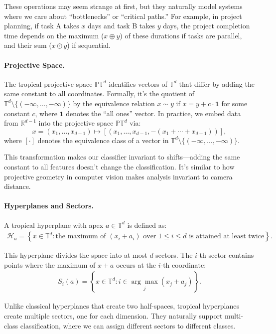 \documentclass{article}
\renewcommand{\leq}{\leqslant}
\newcommand{\R}{\mathbb{R}}
\newcommand{\trop}{\mathbb{T}}
\newcommand{\proj}{\mathbb{P}}
\begin{document}
These operations may seem strange at first, but they naturally model systems where we care about ``bottlenecks'' or ``critical paths.'' For example, in project planning, if task A takes $x$ days and task B takes $y$ days, the project completion time depends on the maximum ($x \oplus y$) of these durations if tasks are parallel, and their sum ($x \odot y$) if sequential.

\paragraph{Projective Space.}  
The tropical projective space $\proj \trop^d$ identifies vectors of $\trop^d$ that differ by adding the same constant to all coordinates. Formally, it's the quotient of $\trop^d \setminus \{(-\infty,\dots,-\infty)\}$ by the equivalence relation $x \sim y$ if $x = y + c \cdot \mathbf{1}$ for some constant $c$, where $\mathbf{1}$ denotes the ``all ones'' vector. In practice, we embed data from $\R^{d-1}$ into the projective space $\proj \trop^d$ via:
\[
x=(x_1,\dots,x_{d-1})\mapsto [(x_1,\dots,x_{d-1},-(x_1+\cdots+x_{d-1}))],
\]
where $[\cdot]$ denotes the equivalence class of a vector in  $\trop^d \setminus \{(-\infty,\dots,-\infty)\}$.

This transformation makes our classifier invariant to shifts—adding the same constant to all features doesn't change the classification. It's similar to how projective geometry in computer vision makes analysis invariant to camera distance.

\paragraph{Hyperplanes and Sectors.}
A tropical hyperplane with apex $a \in \trop^d$ is defined as:
\begin{align}
\mathcal{H}_a = \left\{ x \in \trop^d : \text{the maximum of }(x_i + a_i)\text{ over $1\leq i\leq d$ is attained at least twice} \right\}.
\end{align}

This hyperplane divides the space into at most $d$ sectors. The $i$-th sector contains points where the maximum of $x + a$ occurs at the $i$-th coordinate:
\begin{align}
S_i(a) = \left\{x \in \trop^d : i \in \underset{j}{\arg\max} (x_j + a_j)\right\}.
\end{align}

Unlike classical hyperplanes that create two half-spaces, tropical hyperplanes create multiple sectors, one for each dimension. They naturally support multi-class classification, where we can assign different sectors to different classes.
\end{document}
